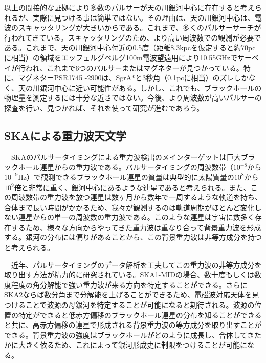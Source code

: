 以上の間接的な証拠により多数のパルサーが天の川銀河中心に存在すると考えられるが、実際に見つける事は簡単ではない。その理由は、天の川銀河中心は、電波のスキャッタリングが大きいからである。これまで、多くのパルサーサーチが行われてきている。スキャッタリングのため、より高い周波数での観測が必要である。これまで、天の川銀河中心付近の0.5度（距離8.3kpcを仮定すると約70pcに相当）の領域をエッフェルグベルグ100m電波望遠用により10.55GHzでサーベイが行われ、これまで6つのパルサーまたはマグネターが見つかっている。特に、マグネターPSR1745 -2900は、SgrA*と3秒角（0.1pcに相当）のズレしかなく、天の川銀河中心に近い可能性がある。しかし、これでも、ブラックホールの物理量を測定するには十分な近さではない。今後、より周波数が高いパルサーの探査を行い、見つかれば、それを使って研究が進むであろう。


\subsection{SKAによる重力波天文学}
　SKAのパルサータイミングによる重力波検出のメインターゲットは巨大ブラックホール連星からの重力波である。パルサータイミングの周波数帯（$10^{-8}$から$10^{-9}$Hz）で観測できるブラックホール連星の質量は典型的に太陽質量の$10^8$から$10^9$倍と非常に重く、銀河中心にあるような連星であると考えられる。また、この周波数帯の重力波を放つ連星は数ヶ月から数年で一周するような軌道を持ち、合体まで長い時間がかかるため、我々が観測するのは軌道周期がほとんど変化しない連星からの単一の周波数の重力波である。このような連星は宇宙に数多く存在するため、様々な方向からやってきた重力波は重なり合って背景重力波を形成する。銀河の分布には偏りがあることから、この背景重力波は非等方成分を持つと考えられる。

　近年、パルサータイミングのデータ解析を工夫してこの重力波の非等方成分を取り出す方法が精力的に研究されている。SKA1-MIDの場合、数十度もしくは数度程度の角分解能で強い重力波が来る方向を特定することができる。さらにSKA2ならば数分角まで分解能を上げることができるため、電磁波対応天体を見つけることで波源の母銀河を特定することが可能になると期待される。波源の位置の特定ができると低赤方偏移のブラックホール連星の分布を知ることができると共に、高赤方偏移の連星で形成される背景重力波の等方成分を取り出すことができる。背景重力波の強度はブラックホールがどのように成長し、合体してきたかに大きく依るため、これによって銀河形成史に制限をつけることが可能になる。

